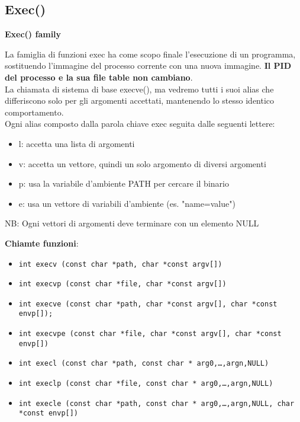 \begin{flushleft}
\begin{flushleft}
    \subsection{Exec()}
    \textbf{Exec() family} \par 
    La famiglia di funzioni exec ha come scopo finale l'esecuzione di un programma, 
    sostituendo l'immagine del processo corrente con una nuova immagine. \textbf{Il PID del
    processo e la sua file table non cambiano}.\\
    La chiamata di sistema di base \ace execve(), ma vedremo tutti i suoi alias che 
    differiscono solo per gli argomenti 
    accettati, mantenendo lo stesso identico comportamento. \\
    Ogni alias \ace composto dalla parola chiave exec seguita dalle seguenti lettere:
    \begin{itemize}
      \item l: accetta una lista di argomenti
      \item v: accetta un vettore, quindi un solo argomento di diversi argomenti
      \item p: usa la variabile d'ambiente PATH per cercare il binario
      \item e: usa un vettore di variabili d'ambiente (es. "name=value") 
    \end{itemize}
    NB: Ogni vettori di argomenti deve terminare con un elemento NULL\par 
    \begin{flushleft}
      \textbf{Chiamte funzioni}: 
      \begin{itemize}
        \item \texttt{int execv (const char *path, char *const argv[])}
        \item \texttt{int execvp (const char *file, char *const argv[])}
        \item \texttt{int execve (const char *path, char *const argv[],
                      char *const envp[]);}
        \item \texttt{int execvpe (const char *file, char *const argv[],
                      char *const envp[])}
        \item \texttt{int execl (const char *path, const char * arg0,…,argn,NULL)}
        \item \texttt{int execlp (const char *file, const char * arg0,…,argn,NULL)}
        \item \texttt{int execle (const char *path, const char * arg0,…,argn,NULL,
                      char *const envp[])}

\end{itemize}
\end{flushleft}
\end{flushleft}
\end{flushleft}
